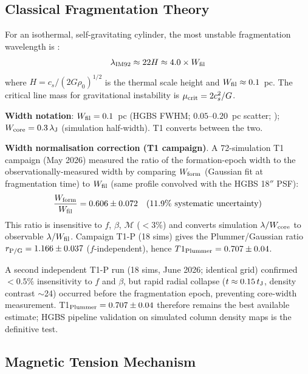 \documentclass[twoside,twocolumn]{mnras}
\begin{document}
\subsection{Classical Fragmentation Theory}

For an isothermal, self-gravitating cylinder, the most unstable fragmentation wavelength
is \citep{Inutsuka1992}:
\begin{equation}
\lambda_{\rm IM92} \approx 22 H \approx 4.0 \times W_{\rm fil}
\label{eq:im92}
\end{equation}
where $H = c_s/(2G\rho_0)^{1/2}$ is the thermal scale height and $W_{\rm fil} \approx 0.1$~pc.
The critical line mass for gravitational instability is $\mu_{\rm crit} = 2c_s^2/G$.

\textbf{Width notation}: $W_{\rm fil} = 0.1$~pc (HGBS FWHM; $0.05$--$0.20$~pc scatter;
\citealt{Panopoulou2022}); $W_{\rm core} = 0.3\,\lambda_{\rm J}$ (simulation half-width).
T1 converts between the two.

\textbf{Width normalisation correction (T1 campaign)}.%
\label{sec:width_correction}
A 72-simulation T1 campaign (May 2026) measured the ratio of the formation-epoch width
to the observationally-measured width by comparing $W_{\rm form}$ (Gaussian fit at
fragmentation time) to $W_{\rm fil}$ (same profile convolved with the HGBS 18$''$ PSF):
\begin{equation}
\frac{W_{\rm form}}{W_{\rm fil}} = 0.606 \pm 0.072 \quad (11.9\% \text{ systematic uncertainty})
\label{eq:t1_correction}
\end{equation}
This ratio is insensitive to $f$, $\beta$, $\mathcal{M}$ ($<3\%$) and converts
simulation $\lambda/W_{\rm core}$ to observable $\lambda/W_{\rm fil}$. Campaign T1-P
(18 sims) gives the Plummer/Gaussian ratio $r_{\rm P/G} = 1.166 \pm 0.037$
($f$-independent), hence $T1_{\rm Plummer} = 0.707 \pm 0.04$.

A second independent T1-P run (18 sims, June 2026; identical grid) confirmed
$<0.5\%$ insensitivity to $f$ and $\beta$, but rapid radial collapse
($t \approx 0.15\,t_{\rm J}$, density contrast $\sim$24) occurred before the
fragmentation epoch, preventing core-width measurement.
T1$_{\rm Plummer} = 0.707 \pm 0.04$ therefore remains the best available estimate;
HGBS pipeline validation on simulated column density maps is the definitive test.

\subsection{Magnetic Tension Mechanism}
\end{document}
